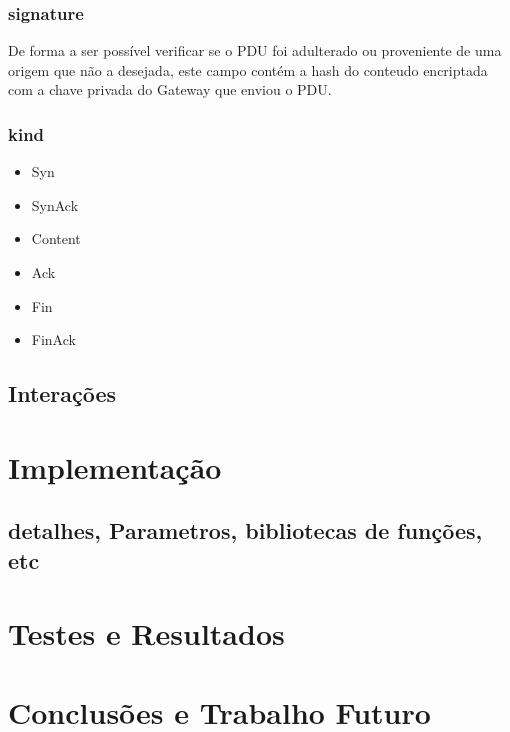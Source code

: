 \documentclass[a4paper]{report}
\begin{document}
\subsection{signature}
De forma a ser possível verificar se o PDU foi adulterado ou proveniente
de uma origem que não a desejada, este campo contém a hash do conteudo
encriptada com a chave privada do Gateway que enviou o PDU.

\subsection{kind}
\begin{itemize}
        \item Syn
        \item SynAck
        \item Content
        \item Ack
        \item Fin
        \item FinAck
\end{itemize}


\section{Interações}

\chapter{Implementação}
\section{detalhes, Parametros, bibliotecas de funções, etc}

\chapter{Testes e Resultados}

\chapter{Conclusões e Trabalho Futuro}
\end{document}
